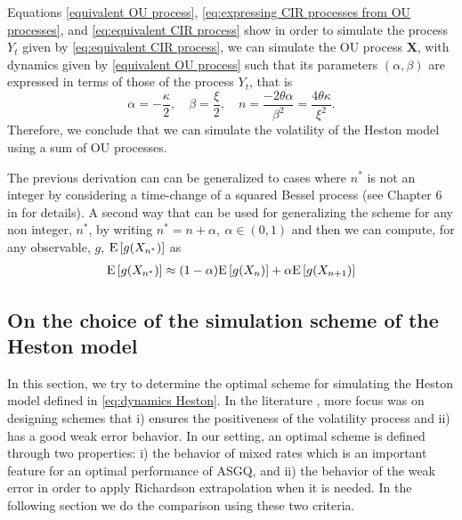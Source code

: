 Equations \eqref{equivalent OU process}, \eqref{eq:expressing CIR processes from OU processes}, and \eqref{eq:equivalent CIR process} show  in order to simulate the process $Y_t$ given by \eqref{eq:equivalent CIR process}, we can  simulate the  OU process  $\mathbf{X}$, with dynamics given by \eqref{equivalent OU process} such that its parameters $(\alpha, \beta)$ are expressed in terms of  those of the  process $Y_t$, that is 
$$ \alpha=-\frac{\kappa}{2},\quad \beta=\frac{\xi}{2}, \quad n=\frac{-2 \theta \alpha}{\beta^2}=\frac{4 \theta  \kappa}{\xi^2}.$$ Therefore, we conclude that we can simulate the volatility of the Heston model using a sum of OU processes.

\begin{remark}
The previous derivation can can be generalized to cases where $n^\ast$ is not an integer by considering a time-change of a squared Bessel process (see Chapter 6 in \cite{jeanblanc2009mathematical} for details). A second way that can be used for generalizing the scheme for  any non integer, $n^\ast$, by writing $n^\ast=n+\alpha, \: \alpha \in (0,1)$ and then we can compute, for any observable, $g$,   $\mathrm{E}\left[g(X_{n^\ast})\right]$ as
\begin{align*}
\mathrm{E}\left[g(X_{n^\ast})\right]\approx (1-\alpha) \mathrm{E}\left[g(X_n)\right]+\alpha \mathrm{E}\left[g(X_{n+1})\right]
\end{align*}
\end{remark}

\subsection{On the choice of the simulation scheme of the Heston model}\label{sec:On the choice of the simulation scheme of the Heston model}
In this section, we try to determine the optimal  scheme for simulating the Heston model defined in \ref{eq:dynamics Heston}.  In the literature  \cite{andersen2007efficient, lord2010comparison,alfonsi2010high}, more focus was on designing schemes that i) ensures the positiveness  of the volatility process and ii) has a good weak error behavior. In our setting, an optimal scheme is defined through two properties: i) the behavior of mixed rates which is an important feature for an  optimal performance of ASGQ, and  ii) the behavior of the weak error in order to apply Richardson extrapolation when it is needed. In the following section we do the comparison using these two criteria.
